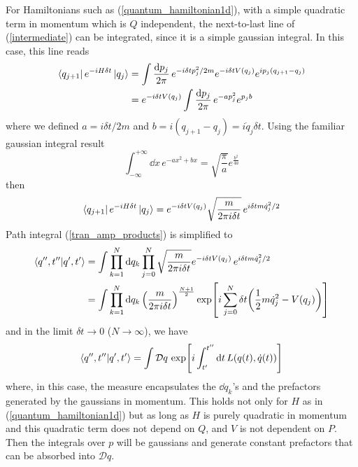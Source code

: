 For Hamiltonians such as (\ref{quantum_hamiltonian1d}), with a simple quadratic term in momentum which is $Q$ independent, the next-to-last line of (\ref{intermediate}) can be integrated, since it is a simple gaussian integral. In this case, this line reads
\begin{equation}
    \begin{aligned}
    \bra{q_{j+1}}e^{-iH\delta t}\ket{q_j}&=\int\frac{\dd p_j}{2\pi}\,e^{-i\delta t p_j^2/2m}e^{-i\delta tV(q_j)}e^{ip_j(q_{j+1}-q_j)}\\
    &=e^{-i\delta tV(q_j)}\int\frac{\dd p_j}{2\pi}\,e^{-ap_j^2}e^{p_jb}
    \end{aligned}
\end{equation}
where we defined $a=i\delta t/2m$ and $b=i(q_{j+1}-q_j)=i\dot{q}_j\delta t$.
Using the familiar gaussian integral result
\begin{equation}
    \int_{-\infty}^{+\infty}\dd x\,e^{-ax^2+bx}=\sqrt{\frac{\pi}{a}}e^{\frac{b^2}{4a}}
\end{equation}
then
\begin{equation}
    \bra{q_{j+1}}e^{-iH\delta t}\ket{q_j}=e^{-i\delta tV(q_j)}\sqrt{\frac{m}{2\pi i \delta t}}\,e^{i\delta tm\dot{q}_j^2/2}
\end{equation}
Path integral (\ref{tran_amp_products}) is simplified to
\begin{equation}
\begin{aligned}
\braket{q^{\prime\prime},t^{\prime\prime}}{q^{\prime},t^{\prime}}&=\int\prod_{k=1}^{N}\dd q_k\prod_{j=0}^N\sqrt{\frac{m}{2\pi i \delta t}}e^{-i\delta tV(q_j)}\,e^{i\delta tm\dot{q}_j^2/2}\\
&=\int\prod_{k=1}^{N}\dd q_k\,\qty(\frac{m}{2\pi i \delta t})^{\frac{N+1}{2}}\exp[i\sum_{j=0}^N\delta t\qty(\frac{1}{2}m\dot{q}^2_j-V(q_j))]
\end{aligned}
\end{equation}
and in the limit $\delta t\to 0$ ($N\to\infty$), we have
\begin{equation}
   \braket{q^{\prime\prime},t^{\prime\prime}}{q^{\prime},t^{\prime}}= \int\mathcal{D}q\, \exp[i\int_{t^\prime}^{t^{\prime\prime}}\dd t\,L(q(t),\dot{q}(t))]
   \label{path_integral_lagrangian}
\end{equation}
where, in this case, the measure encapsulates the $\dd q_k$'s and the prefactors generated by the gaussians in momentum. This holds not only for $H$ as in (\ref{quantum_hamiltonian1d}) but as long as $H$ is purely quadratic in momentum and this quadratic term does not depend on $Q$, and $V$ is not dependent on $P$. Then the integrals over $p$ will be gaussians and generate constant prefactors that can be absorbed into $\mathcal{D}q$.\\

